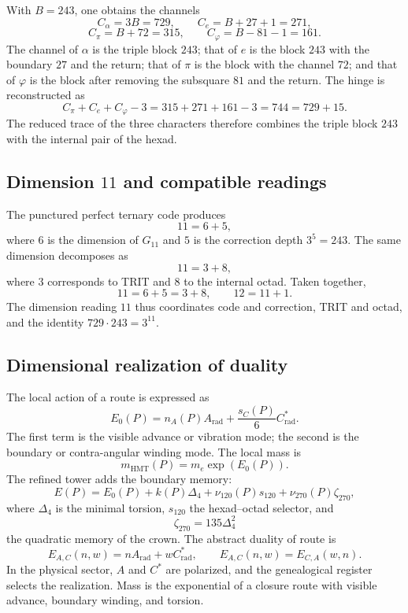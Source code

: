 With \(B=243\), one obtains the channels
\[
C_\alpha=3B=729,
\qquad
C_e=B+27+1=271,
\]
\[
C_\pi=B+72=315,
\qquad
C_\varphi=B-81-1=161.
\]
The channel of \(\alpha\) is the triple block \(243\); that of \(e\) is the block
\(243\) with the boundary \(27\) and the return; that of \(\pi\) is the block with the
channel \(72\); and that of \(\varphi\) is the block after removing the
subsquare \(81\) and the return.
The hinge is reconstructed as
\[
C_\pi+C_e+C_\varphi-3
=315+271+161-3
=744
=729+15.
\]
The reduced trace of the three characters therefore combines the triple block
\(243\) with the internal pair of the hexad.

\subsection{Dimension \texorpdfstring{\(11\)}{11} and compatible readings}

The punctured perfect ternary code produces
\[
11=6+5,
\]
where \(6\) is the dimension of \(G_{11}\) and \(5\) is the correction depth \(3^5=243\). The same dimension decomposes as
\[
11=3+8,
\]
where \(3\) corresponds to TRIT and \(8\) to the internal octad. Taken together,
\[
11=6+5=3+8,
\qquad
12=11+1.
\]
The dimension reading \(11\) thus coordinates code and correction, TRIT and octad, and the identity \(729\cdot243=3^{11}\).

\subsection{Dimensional realization of duality}

The local action of a route is expressed as
\[
E_0(P)=n_A(P)A_{\mathrm{rad}}
+\frac{s_C(P)}{6}C^*_{\mathrm{rad}}.
\]
The first term is the visible advance or vibration mode; the second is the
boundary or contra-angular winding mode. The local mass is
\[
m_{\mathrm{HMT}}(P)=m_e\exp(E_0(P)).
\]
The refined tower adds the boundary memory:
\[
E(P)=E_0(P)+k(P)\Delta_4
+\nu_{120}(P)s_{120}
+\nu_{270}(P)\zeta_{270},
\]
where \(\Delta_4\) is the minimal torsion, \(s_{120}\) the
hexad--octad selector, and
\[
\zeta_{270}=135\Delta_4^2
\]
the quadratic memory of the crown. The abstract duality of route is
\[
E_{A,C}(n,w)=nA_{\mathrm{rad}}+wC^*_{\mathrm{rad}},
\qquad
E_{A,C}(n,w)=E_{C,A}(w,n).
\]
In the physical sector, \(A\) and \(C^*\) are polarized, and the genealogical register selects
the realization. Mass is the exponential of a closure route with visible advance,
boundary winding, and torsion.

